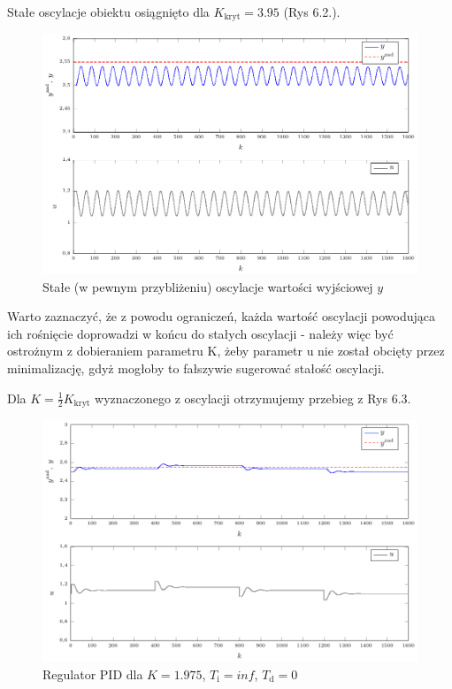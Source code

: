 Stałe oscylacje obiektu osiągnięto dla $K_{\mathrm{kryt}}=\num{3.95}$ (Rys 6.2.).


\begin{figure}[tb] 
\centering 
\includegraphics[scale=1]{rysunki/zapisz_pdf/oscylacje.pdf} 
\caption{Stałe (w pewnym przybliżeniu) oscylacje wartości wyjściowej $y$} 
\label{r_pgfplots_funkcje} 
\end{figure}


Warto zaznaczyć, że z powodu ograniczeń, każda wartość oscylacji powodująca ich rośnięcie doprowadzi w końcu do stałych oscylacji - należy więc być ostrożnym z dobieraniem parametru K, żeby parametr u nie został obcięty przez minimalizację, gdyż mogłoby to fałszywie sugerować stałość oscylacji.


Dla $K=\frac{1}{2}K_{\mathrm{kryt}}$ wyznaczonego z oscylacji otrzymujemy przebieg z Rys 6.3. 


\begin{figure}[tb] 
\centering 
\includegraphics[scale=1]{rysunki/zapisz_pdf/PID_K=1.975_Ti=Inf_Td=0.00.pdf} 
\caption{Regulator PID dla $K=\num{1.975}$, $T_{\mathrm{i}}=inf$, $T_{\mathrm{d}}=0$} 
\label{r_pgfplots_PID_K=1.975_Ti=Inf_Td=0.00} 
\end{figure}

